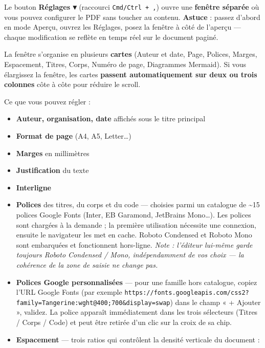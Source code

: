 \documentclass[11pt,a4paper]{article}
\theoremstyle{definition}
\begin{document}
Le bouton \textbf{Réglages ▾} (raccourci \texttt{Cmd/Ctrl + ,}) ouvre une
\textbf{fenêtre séparée} où vous pouvez configurer le PDF sans toucher
au contenu. \textbf{Astuce} : passez d'abord en mode Aperçu, ouvrez les
Réglages, posez la fenêtre à côté de l'aperçu — chaque modification
se reflète en temps réel sur le document paginé.


La fenêtre s'organise en plusieurs \textbf{cartes} (Auteur et date, Page,
Polices, Marges, Espacement, Titres, Corps, Numéro de page,
Diagrammes Mermaid). Si vous élargissez la fenêtre, les cartes
\textbf{passent automatiquement sur deux ou trois colonnes} côte à côte
pour réduire le scroll.


Ce que vous pouvez régler :


\begin{itemize}
  \item \textbf{Auteur, organisation, date} affichés sous le titre principal
  \item \textbf{Format de page} (A4, A5, Letter…)
  \item \textbf{Marges} en millimètres
  \item \textbf{Justification} du texte
  \item \textbf{Interligne}
  \item \textbf{Polices} des titres, du corps et du code — choisies parmi un
catalogue de \textasciitilde{}15 polices Google Fonts (Inter, EB Garamond,
JetBrains Mono…). Les polices sont chargées à la demande ; la
première utilisation nécessite une connexion, ensuite le
navigateur les met en cache. Roboto Condensed et Roboto Mono
sont embarquées et fonctionnent hors-ligne. \emph{Note : l'éditeur
lui-même garde toujours Roboto Condensed / Mono, indépendamment
de vos choix — la cohérence de la zone de saisie ne change pas.}
  \item \textbf{Polices Google personnalisées} — pour une famille hors
catalogue, copiez l'URL Google Fonts (par exemple
\texttt{https://fonts.googleapis.com/css2?family=Tangerine:wght@400;700\&display=swap})
dans le champ « + Ajouter », validez. La police apparaît
immédiatement dans les trois sélecteurs (Titres / Corps / Code)
et peut être retirée d'un clic sur la croix de sa chip.
  \item \textbf{Espacement} — trois ratios qui contrôlent la densité verticale
du document :


\end{itemize}
\end{document}
